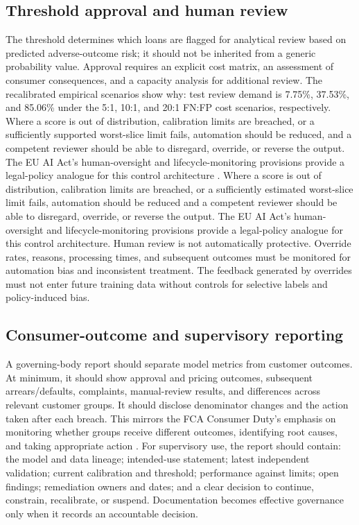 \documentclass[10pt]{article}
\begin{document}
\subsection{Threshold approval and human review}

The threshold determines which loans are flagged for analytical review based on predicted adverse-outcome risk; it should not be inherited from a generic probability value. Approval requires an explicit cost matrix, an assessment of consumer consequences, and a capacity analysis for additional review. The recalibrated empirical scenarios show why: test review demand is 7.75\%, 37.53\%, and 85.06\% under the 5:1, 10:1, and 20:1 FN:FP cost scenarios, respectively. Where a score is out of distribution, calibration limits are breached, or a sufficiently supported worst-slice limit fails, automation should be reduced, and a competent reviewer should be able to disregard, override, or reverse the output. The EU AI Act's human-oversight and lifecycle-monitoring provisions provide a legal-policy analogue for this control architecture \cite{ref40}. Where a score is out of distribution, calibration limits are breached, or a sufficiently estimated worst-slice limit fails, automation should be reduced and a competent reviewer should be able to disregard, override, or reverse the output. The EU AI Act's human-oversight and lifecycle-monitoring provisions provide a legal-policy analogue for this control architecture. Human review is not automatically protective. Override rates, reasons, processing times, and subsequent outcomes must be monitored for automation bias and inconsistent treatment. The feedback generated by overrides must not enter future training data without controls for selective labels and policy-induced bias.

\subsection{Consumer-outcome and supervisory reporting}

A governing-body report should separate model metrics from customer outcomes. At minimum, it should show approval and pricing outcomes, subsequent arrears/defaults, complaints, manual-review results, and differences across relevant customer groups. It should disclose denominator changes and the action taken after each breach. This mirrors the FCA Consumer Duty's emphasis on monitoring whether groups receive different outcomes, identifying root causes, and taking appropriate action \cite{ref46}. For supervisory use, the report should contain: the model and data lineage; intended-use statement; latest independent validation; current calibration and threshold; performance against limits; open findings; remediation owners and dates; and a clear decision to continue, constrain, recalibrate, or suspend. Documentation becomes effective governance only when it records an accountable decision.
\end{document}
